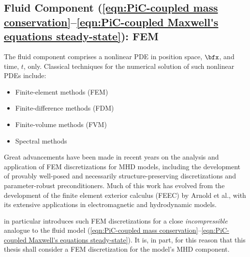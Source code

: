 \subsection*{Fluid Component (\ref{eqn:PiC-coupled mass conservation}--\ref{eqn:PiC-coupled Maxwell's equations steady-state}): FEM}
    The fluid component comprises a nonlinear PDE in position space, $\bfx$, and time, $t$, only. Classical techniques for the numerical solution of such nonlinear PDEs include:
    \begin{itemize}
        \item  Finite-element methods (FEM)
        \item  Finite-difference methods (FDM)
        \item  Finite-volume methods (FVM)
        \item  Spectral methods
    \end{itemize}
    Great advancements have been made in recent years on the analysis and application of FEM discretizations for MHD models, including the development of provably well-posed and necessarily structure-preserving discretizations and parameter-robust preconditioners. \cite{Hu_Xu_2015, Hu_Ma_Xu_2017, Hu_Lee_Xu_2021, Green_et_al_2022, LFM22, Laakmann_Hu_Farrell_2022} Much of this work has evolved from the development of the finite element exterior calculus (FEEC) by Arnold et al., with its extensive applications in electromagnetic and hydrodynamic models. \cite{Arnold_Falk_Winther_2006, Arnold_Falk_Winther_2009, Arnold_2018}
    
    \cite{Laakmann_Hu_Farrell_2022} in particular introduces such FEM discretizations for a close \emph{incompressible} analogue to the fluid model (\ref{eqn:PiC-coupled mass conservation}--\ref{eqn:PiC-coupled Maxwell's equations steady-state}). It is, in part, for this reason that this thesis shall consider a FEM discretization for the model's MHD component.
    